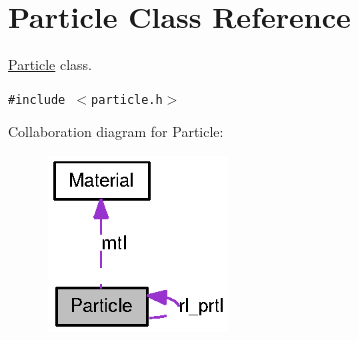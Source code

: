 \hypertarget{classParticle}{
\section{Particle Class Reference}
\label{classParticle}
}
\hyperlink{classParticle}{Particle} class.  


{\tt \#include $<$particle.h$>$}

Collaboration diagram for Particle:\nopagebreak
\begin{figure}[H]
\begin{center}
\leavevmode
\includegraphics[width=135pt]{classParticle__coll__graph}
\end{center}
\end{figure}
